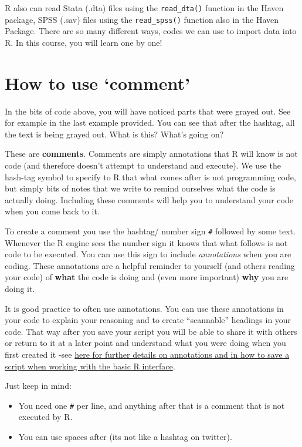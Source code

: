 \documentclass[
]{book}
\begin{document}
R also can read Stata (.dta) files using the \texttt{read\_dta()} function in the Haven package, SPSS (.sav) files using the \texttt{read\_spss()} function also in the Haven Package. There are so many different ways, codes we can use to import data into R. In this course, you will learn one by one!

\section{How to use `comment'}\label{how-to-use-comment}

In the bits of code above, you will have noticed parts that were grayed out. See for example in the last example provided. You can see that after the hashtag, all the text is being grayed out. What is this? What's going on?

These are \textbf{comments}. Comments are simply annotations that R will know is not code (and therefore doesn't attempt to understand and execute). We use the hash-tag symbol to specify to R that what comes after is not programming code, but simply bits of notes that we write to remind ourselves what the code is actually doing. Including these comments will help you to understand your code when you come back to it.

To create a comment you use the hashtag/ number sign \texttt{\#} followed by some text. Whenever the R engine sees the number sign it knows that what follows is not code to be executed. You can use this sign to include \emph{annotations} when you are coding. These annotations are a helpful reminder to yourself (and others reading your code) of \textbf{what} the code is doing and (even more important) \textbf{why} you are doing it.

It is good practice to often use annotations. You can use these annotations in your code to explain your reasoning and to create ``scannable'' headings in your code. That way after you save your script you will be able to share it with others or return to it at a later point and understand what you were doing when you first created it -see \href{http://mercury.webster.edu/aleshunas/R_learning_infrastructure/R\%20scripts.html}{here for further details on annotations and in how to save a script when working with the basic R interface}.

Just keep in mind:

\begin{itemize}
\item
  You need one \texttt{\#} per line, and anything after that is a comment that is not executed by R.
\item
  You can use spaces after (its not like a hashtag on twitter).
\end{itemize}
\end{document}
